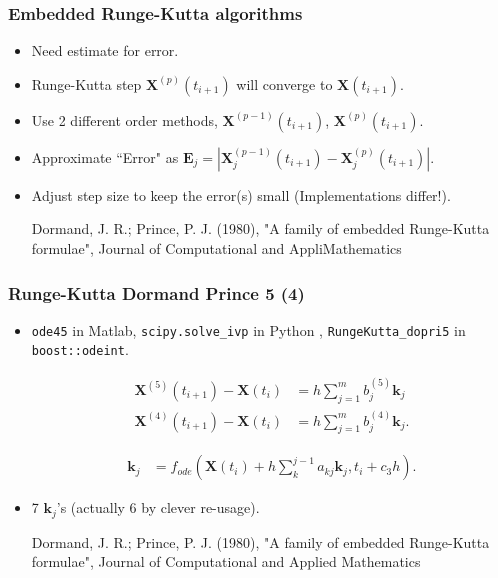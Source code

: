 \documentclass{beamer}
\begin{document}
\begin{frame}
\frametitle{Embedded Runge-Kutta algorithms}
\begin{itemize}
\item <1-> Need estimate for error.

\item <2-> Runge-Kutta step $\mathbf{X}^{(p)}(t_{i+1})$ will converge to $\mathbf{X}(t_{i+1})$.
\item <3-> Use 2 different order methods, $\mathbf{X}^{(p-1)}(t_{i+1})$, $\mathbf{X}^{(p)}(t_{i+1})$.

\item <4-> Approximate ``Error" as  $\mathbf{E}_j = |\mathbf{X}^{(p-1)}_j(t_{i+1})-\mathbf{X}^{(p)}_j(t_{i+1})|$.

\item <5-> Adjust step size to keep the error(s) small (Implementations differ!).

{\color{gray} Dormand, J. R.; Prince, P. J. (1980), "A family of embedded Runge-Kutta formulae", Journal of Computational and AppliMathematics}
\begin{equation}
\end{equation}


\end{itemize}
\end{frame}


\begin{frame}
\frametitle{Runge-Kutta Dormand Prince 5 (4)}

\begin{itemize}
\item <1->\lstinline{ode45} in Matlab, \lstinline{scipy.solve_ivp} in Python , \lstinline{RungeKutta_dopri5} in \lstinline{boost::odeint}.

\begin{align*}
\mathbf{X}^{(5)}(t_{i+1})-\mathbf{X}(t_{i}) &=  h \sum_{j=1}^{m} b_j^{(5)} \mathbf{k}_j\\
\mathbf{X}^{(4)}(t_{i+1})-\mathbf{X}(t_{i}) &=  h \sum_{j=1}^{m} b_j^{(4)} \mathbf{k}_j.
\end{align*}

\begin{align*}
\mathbf{k}_j &= f_{ode}(\mathbf{X}(t_i)+h \sum_k^{j-1} a_{kj} \mathbf{k}_j,t_i+c_3 h).
\end{align*}

\item <2-> 7 $\mathbf{k}_j$'s (actually 6 by clever re-usage).

{\color{gray} Dormand, J. R.; Prince, P. J. (1980), "A family of embedded Runge-Kutta formulae", Journal of Computational and Applied Mathematics}
\end{itemize}
\end{frame}
\end{document}
